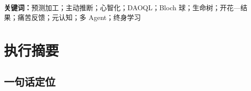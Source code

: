 \documentclass[UTF8,a4paper,11pt]{ctexart}
\begin{document}
\begin{abstract}
Tender 试图回答一个问题：当知识、答案与一般问题求解能力越来越容易获得，教育系统还能为一个人的一生提供什么？本白皮书给出的答案是：提供一套持续理解、校准并支持心智成长的环境，让每个人能够形成自己的价值证据、选择值得追求的问题、承担真实后果，并在需要时获得恰到好处的帮助。

项目以预测加工理论与心智化理论作为当前的核心认知框架。人不是被动接收信息的容器，而是在有限感官与行动能力下，用生成模型预测世界、通过预测误差修正模型，并通过行动改变世界。人与世界的交往主要沿预测加工回路展开；人与人的交往则还需要心智化回路：推断他人的信念、情绪、意图和视角，并意识到自己的推断可能错误。学习是生命树内部结构与能力的生长；开花是生命树向外部世界表达、提问、教学、协作、试验和创作；结果是不同外界交互所产生的分化后果。本文进一步把痛苦视为一种高权重反馈：它可能来自探索后的边界、错配、责任代价或伤害，因此必须区分可转化的困难与需要保护、退出和求助的伤害。内倾、外倾、大五、MBTI 与荣格八维被作为早期行为先验，用来在缺乏长期数据时初始化支持方式，随后由真实生长、开花与结果持续覆盖。语言层只负责从话语中提取可观察证据片段和候选假设，不能直接决定知识掌握、人格或临床结论；语言模型、Tender 状态融合、答题结果与真实行动必须分开记录。Tender 因此把系统分为客观世界、有限接触面、主观体验和 Agent 支持四类边界：DAOQL 是世界性质的事件存储，可不断从黑盒 API 与异构数据源提取事实；Bloch 球表示人类实际能够接触和测量的有限客观环境；Agent Bridge 负责把客观事件翻译成可更正的主观体验；生命树树冠由功能脑区式的体验分区构成，其他专家 Agent 作为环绕树冠的“天使”提供支持。

白皮书同时披露当前实现与证据：数据库快照包含 10,613 个事件、1,976 条因果与来源边、916 个身份、155 个主观体验节点和 107 个体验摘要；长期合成验证覆盖 8 个学习者、每人 8 轮、跨 12 周；自动测试 93 项。本文严格区分“系统已能运行”“在教育理论上合理”“已有真人因果证据”三种状态。Tender 的下一阶段不是继续堆叠功能，而是把预测误差、精度、元认知校准、行动恢复和创造迁移转化为预注册的实证研究。
\end{abstract}

\noindent\textbf{关键词：}预测加工；主动推断；心智化；DAOQL；Bloch 球；生命树；开花—结果；痛苦反馈；元认知；多 Agent；终身学习

\newpage
\section{执行摘要}

\subsection{一句话定位}
\end{document}
